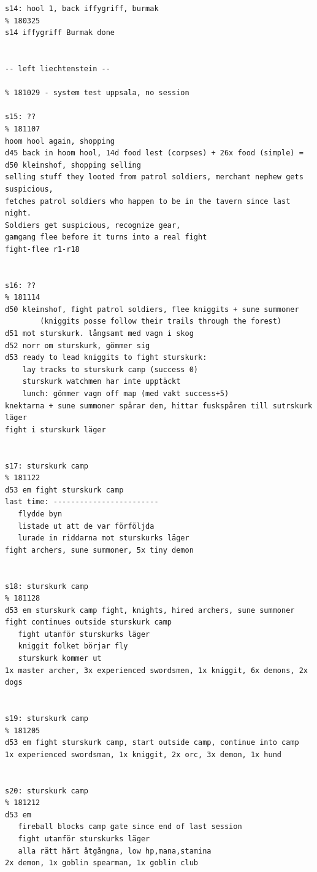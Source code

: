 \begin{verbatim}
s14: hool 1, back iffygriff, burmak                                     % 180325
s14 iffygriff Burmak done


-- left liechtenstein --

% 181029 - system test uppsala, no session

s15: ??                                                                 % 181107
hoom hool again, shopping
d45 back in hoom hool, 14d food lest (corpses) + 26x food (simple) =  
d50 kleinshof, shopping selling
selling stuff they looted from patrol soldiers, merchant nephew gets suspicious,
fetches patrol soldiers who happen to be in the tavern since last night.
Soldiers get suspicious, recognize gear,
gamgang flee before it turns into a real fight
fight-flee r1-r18


s16: ??                                                                 % 181114
d50 kleinshof, fight patrol soldiers, flee kniggits + sune summoner
        (kniggits posse follow their trails through the forest)
d51 mot sturskurk. långsamt med vagn i skog
d52 norr om sturskurk, gömmer sig
d53 ready to lead kniggits to fight sturskurk:
    lay tracks to sturskurk camp (success 0)
    sturskurk watchmen har inte upptäckt
    lunch: gömmer vagn off map (med vakt success+5)
knektarna + sune summoner spårar dem, hittar fuskspåren till sutrskurk läger
fight i sturskurk läger


s17: sturskurk camp                                                     % 181122
d53 em fight sturskurk camp
last time: ------------------------
   flydde byn
   listade ut att de var förföljda
   lurade in riddarna mot sturskurks läger
fight archers, sune summoner, 5x tiny demon


s18: sturskurk camp                                                     % 181128
d53 em sturskurk camp fight, knights, hired archers, sune summoner
fight continues outside sturskurk camp
   fight utanför sturskurks läger
   kniggit folket börjar fly
   sturskurk kommer ut
1x master archer, 3x experienced swordsmen, 1x kniggit, 6x demons, 2x dogs


s19: sturskurk camp                                                     % 181205
d53 em fight sturskurk camp, start outside camp, continue into camp
1x experienced swordsman, 1x kniggit, 2x orc, 3x demon, 1x hund


s20: sturskurk camp                                                     % 181212
d53 em
   fireball blocks camp gate since end of last session
   fight utanför sturskurks läger
   alla rätt hårt åtgångna, low hp,mana,stamina
2x demon, 1x goblin spearman, 1x goblin club



\end{verbatim}
